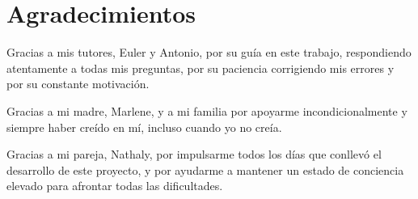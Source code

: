 \chapter*{Agradecimientos}

\par Gracias a mis tutores, Euler y Antonio, por su guía en este trabajo, respondiendo atentamente a todas mis preguntas, por su paciencia corrigiendo mis errores y por su constante motivación.
\vspace{15pt}
\par Gracias a mi madre, Marlene, y a mi familia por apoyarme incondicionalmente y siempre haber creído en mí, incluso cuando yo no creía.
\vspace{15pt}
\par Gracias a mi pareja, Nathaly, por impulsarme todos los días que conllevó el desarrollo de este proyecto, y por ayudarme a mantener un estado de conciencia elevado para afrontar todas las dificultades.